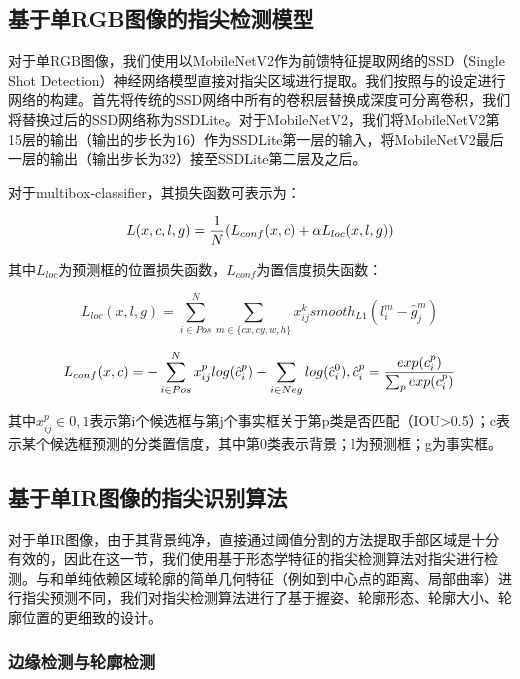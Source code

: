 \subsection{基于单RGB图像的指尖检测模型}

对于单RGB图像，我们使用以MobileNetV2作为前馈特征提取网络的SSD（Single Shot Detection）神经网络模型直接对指尖区域进行提取。我们按照与的设定进行网络的构建。首先将传统的SSD网络中所有的卷积层替换成深度可分离卷积，我们将替换过后的SSD网络称为SSDLite。对于MobileNetV2，我们将MobileNetV2第15层的输出（输出的步长为16）作为SSDLite第一层的输入，将MobileNetV2最后一层的输出（输出步长为32）接至SSDLite第二层及之后。


对于multibox-classifier，其损失函数可表示为：

\begin{equation}
    L(x,c,l,g)={1 \over N}(L_{conf}(x,c) + \alpha L_{loc}(x,l,g))
\end{equation}

其中$L_{loc}$为预测框的位置损失函数，$L_{conf}$为置信度损失函数：

\begin{equation}
    L_{loc}(x,l,g)= \sum_{i \in Pos}^N \sum_{m \in \{cx, cy, w, h\}} x_{ij}^k smooth_{L1}(l_i^m-\hat{g}_j^m)
\end{equation}

\begin{equation}
    L_{conf}(x,c)=- \sum_{i \in Pos}^N x_{ij}^p log(\hat{c}_i^p) - \sum_{i \in Neg} log(\hat{c}_i^0), \hat{c}_i^p = {exp(c_i^p) \over {\sum_p exp(c_i^p)}}
\end{equation}

其中$x_{ij}^p \in {0,1}$表示第i个候选框与第j个事实框关于第p类是否匹配（IOU>0.5）；c表示某个候选框预测的分类置信度，其中第0类表示背景；l为预测框；g为事实框。

\subsection{基于单IR图像的指尖识别算法}
对于单IR图像，由于其背景纯净，直接通过阈值分割的方法提取手部区域是十分有效的，因此在这一节，我们使用基于形态学特征的指尖检测算法对指尖进行检测。与和单纯依赖区域轮廓的简单几何特征（例如到中心点的距离、局部曲率）进行指尖预测不同，我们对指尖检测算法进行了基于握姿、轮廓形态、轮廓大小、轮廓位置的更细致的设计。

\subsubsection{边缘检测与轮廓检测}

